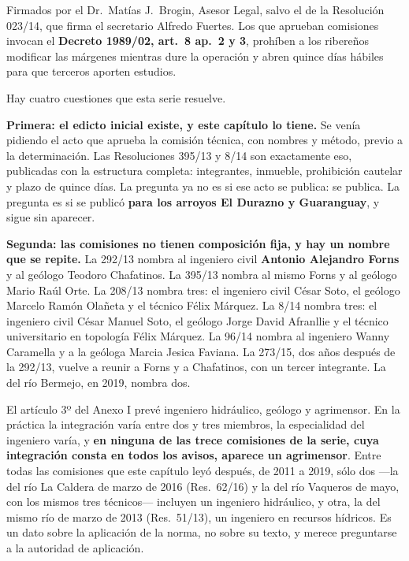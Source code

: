 Firmados por el Dr.\ Matías J.\ Brogin, Asesor Legal, salvo el de la Resolución 023/14, que firma el secretario Alfredo Fuertes. Los que aprueban comisiones invocan el \textbf{Decreto 1989/02, art.\ 8 ap.\ 2 y 3}, prohíben a los ribereños modificar las márgenes mientras dure la operación y abren quince días hábiles para que terceros aporten estudios.

Hay cuatro cuestiones que esta serie resuelve.

\textbf{Primera: el edicto inicial existe, y este capítulo lo tiene.} Se venía pidiendo el acto que aprueba la comisión técnica, con nombres y método, previo a la determinación. Las Resoluciones 395/13 y 8/14 son exactamente eso, publicadas con la estructura completa: integrantes, inmueble, prohibición cautelar y plazo de quince días. La pregunta ya no es si ese acto se publica: se publica. La pregunta es si se publicó \textbf{para los arroyos El Durazno y Guaranguay}, y sigue sin aparecer.

\textbf{Segunda: las comisiones no tienen composición fija, y hay un nombre que se repite.} La 292/13 nombra al ingeniero civil \textbf{Antonio Alejandro Forns} y al geólogo Teodoro Chafatinos. La 395/13 nombra al mismo Forns y al geólogo Mario Raúl Orte. La 208/13 nombra tres: el ingeniero civil César Soto, el geólogo Marcelo Ramón Olañeta y el técnico Félix Márquez. La 8/14 nombra tres: el ingeniero civil César Manuel Soto, el geólogo Jorge David Afranllie y el técnico universitario en topología Félix Márquez. La 96/14 nombra al ingeniero Wanny Caramella y a la geóloga Marcia Jesica Faviana. La 273/15, dos años después de la 292/13, vuelve a reunir a Forns y a Chafatinos, con un tercer integrante. La del río Bermejo, en 2019, nombra dos.

El artículo 3º del Anexo I prevé ingeniero hidráulico, geólogo y agrimensor. En la práctica la integración varía entre dos y tres miembros, la especialidad del ingeniero varía, y \textbf{en ninguna de las trece comisiones de la serie, cuya integración consta en todos los avisos, aparece un agrimensor}. Entre todas las comisiones que este capítulo leyó después, de 2011 a 2019, sólo dos ---la del río La Caldera de marzo de 2016 (Res.\ 62/16) y la del río Vaqueros de mayo, con los mismos tres técnicos--- incluyen un ingeniero hidráulico, y otra, la del mismo río de marzo de 2013 (Res.\ 51/13), un ingeniero en recursos hídricos. Es un dato sobre la aplicación de la norma, no sobre su texto, y merece preguntarse a la autoridad de aplicación.

